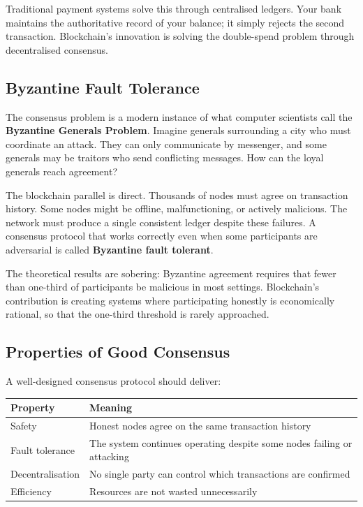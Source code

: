 \documentclass[11pt,a4paper]{article}
\newcommand{\keyword}[1]{\textbf{\textcolor{AccentOrange}{#1}}}
\begin{document}
Traditional payment systems solve this through centralised ledgers. Your bank maintains the authoritative record of your balance; it simply rejects the second transaction. Blockchain's innovation is solving the double-spend problem through decentralised consensus.

\subsection{Byzantine Fault Tolerance}

The consensus problem is a modern instance of what computer scientists call the \keyword{Byzantine Generals Problem}. Imagine generals surrounding a city who must coordinate an attack. They can only communicate by messenger, and some generals may be traitors who send conflicting messages. How can the loyal generals reach agreement?

The blockchain parallel is direct. Thousands of nodes must agree on transaction history. Some nodes might be offline, malfunctioning, or actively malicious. The network must produce a single consistent ledger despite these failures. A consensus protocol that works correctly even when some participants are adversarial is called \keyword{Byzantine fault tolerant}.

The theoretical results are sobering: Byzantine agreement requires that fewer than one-third of participants be malicious in most settings. Blockchain's contribution is creating systems where participating honestly is economically rational, so that the one-third threshold is rarely approached.

\subsection{Properties of Good Consensus}

A well-designed consensus protocol should deliver:

\begin{center}
\begin{tabular}{lp{9cm}}
\toprule
\textbf{Property} & \textbf{Meaning} \\
\midrule
Safety & Honest nodes agree on the same transaction history \\
Fault tolerance & The system continues operating despite some nodes failing or attacking \\
Decentralisation & No single party can control which transactions are confirmed \\
Efficiency & Resources are not wasted unnecessarily \\
\bottomrule
\end{tabular}
\end{center}
\end{document}
